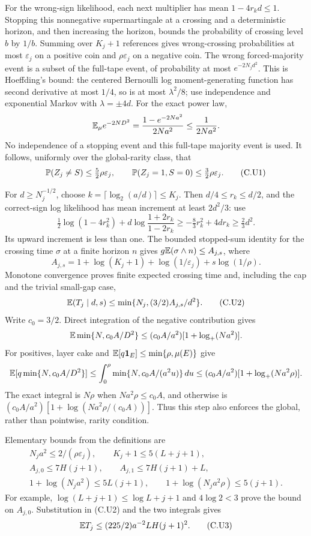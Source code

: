 For the wrong-sign likelihood, each next multiplier has mean $1-4r_kd\le1$.
Stopping this nonnegative supermartingale at a crossing and a deterministic
horizon, and then increasing the horizon, bounds the probability of crossing
level $b$ by $1/b$. Summing over $K_j+1$ references gives wrong-crossing
probabilities at most $\varepsilon_j$ on a positive coin and
$\rho\varepsilon_j$ on a negative coin. The wrong forced-majority event is
a subset of the full-tape event, of probability at most $e^{-2N_jd^2}$.
This is Hoeffding's bound: the centered Bernoulli log moment-generating
function has second derivative at most $1/4$, so is at most $\lambda^2/8$;
use independence and exponential Markov with $\lambda=\pm4d$.
For the exact power law,
\[
 \mathbb E_\mu e^{-2ND^2}=\frac{1-e^{-2Na^2}}{2Na^2}\le\frac1{2Na^2}.
\]
No independence of a stopping event and this full-tape majority event is used.
It follows, uniformly over the global-rarity class, that
\[
 \mathbb P(Z_j\ne S)\le\tfrac52\rho\varepsilon_j,
 \qquad \mathbb P(Z_j=1,S=0)\le\tfrac32\rho\varepsilon_j.       \tag{C.U1}
\]

For $d\ge N_j^{-1/2}$, choose $k=\lceil\log_2(a/d)\rceil\le K_j$.
Then $d/4\le r_k\le d/2$, and the correct-sign log likelihood has mean
increment at least $2d^2/3$: use
\[
 \tfrac12\log(1-4r_k^2)
       +d\log\frac{1+2r_k}{1-2r_k}
 \ge-\tfrac83r_k^2+4dr_k\ge\tfrac23d^2.
\]
Its upward increment is less than one. The bounded stopped-sum identity for
the crossing time $\sigma$ at a finite horizon $n$ gives
$g\mathbb E(\sigma\wedge n)\le A_{j,s}$, where
\[
 A_{j,s}=1+\log(K_j+1)+\log(1/\varepsilon_j)+s\log(1/\rho).
\]
Monotone convergence proves finite expected crossing time and, including the
cap and the trivial small-gap case,
\[
 \mathbb E(T_j\mid d,s)\le\min\{N_j,(3/2)A_{j,s}/d^2\}.        \tag{C.U2}
\]
Write $c_0=3/2$. Direct integration of the negative contribution gives
\[
 \mathbb E\min\{N,c_0A/D^2\}
 \le(c_0A/a^2)[1+\log_+(Na^2)].
\]
For positives, layer cake and
$\mathbb E[q\mathbf 1_E]\le\min\{\rho,\mu(E)\}$ give
\[
 \mathbb E[q\min\{N,c_0A/D^2\}]
 \le\int_0^\rho\min\{N,c_0A/(a^2u)\}\,du
 \le(c_0A/a^2)[1+\log_+(Na^2\rho)].
\]
The exact integral is $N\rho$ when $Na^2\rho\le c_0A$, and otherwise is
$(c_0A/a^2)[1+\log(Na^2\rho/(c_0A))]$. Thus this step also enforces the
global, rather than pointwise, rarity condition.

Elementary bounds from the definitions are
\[
\begin{gathered}
 N_ja^2\le2/(\rho\varepsilon_j),\qquad K_j+1\le5(L+j+1),\\
 A_{j,0}\le7H(j+1),\qquad A_{j,1}\le7H(j+1)+L,\\
 1+\log(N_ja^2)\le5L(j+1),\qquad
 1+\log(N_ja^2\rho)\le5(j+1).
\end{gathered}
\]
For example, $\log(L+j+1)\le\log L+j+1$ and $4\log2<3$ prove the
bound on $A_{j,0}$. Substitution in (C.U2) and the two integrals gives
\[
 \mathbb E T_j\le(225/2)a^{-2}LH(j+1)^2.                        \tag{C.U3}
\]

